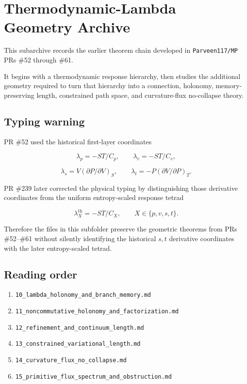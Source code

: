 \hypertarget{thermodynamic-lambda-geometry-archive}{%
\chapter{Thermodynamic-Lambda Geometry Archive}\label{thermodynamic-lambda-geometry-archive}}

This subarchive records the earlier theorem chain developed in \texttt{Parveen117/MP} PRs \#52 through \#61.

It begins with a thermodynamic response hierarchy, then studies the additional geometry required to turn that hierarchy into a connection, holonomy, memory-preserving length, constrained path space, and curvature-flux no-collapse theory.

\hypertarget{typing-warning}{%
\section{Typing warning}\label{typing-warning}}

PR \#52 used the historical first-layer coordinates

\[
\lambda_p=-ST/C_p,
\qquad
\lambda_v=-ST/C_v,
\]

\[
\lambda_s=V(\partial P/\partial V)_S,
\qquad
\lambda_t=-P(\partial V/\partial P)_T.
\]

PR \#239 later corrected the physical typing by distinguishing those derivative coordinates from the uniform entropy-scaled response tetrad

\[
\lambda_X^{\mathrm{th}}=-ST/C_X,
\qquad X\in\{p,v,s,t\}.
\]

Therefore the files in this subfolder preserve the geometric theorems from PRs \#52--\#61 without silently identifying the historical \(s,t\) derivative coordinates with the later entropy-scaled tetrad.

\hypertarget{reading-order}{%
\section{Reading order}\label{reading-order}}

\begin{enumerate}
\def\labelenumi{\arabic{enumi}.}
\tightlist
\item
  \texttt{10\_lambda\_holonomy\_and\_branch\_memory.md}
\item
  \texttt{11\_noncommutative\_holonomy\_and\_factorization.md}
\item
  \texttt{12\_refinement\_and\_continuum\_length.md}
\item
  \texttt{13\_constrained\_variational\_length.md}
\item
  \texttt{14\_curvature\_flux\_no\_collapse.md}
\item
  \texttt{15\_primitive\_flux\_spectrum\_and\_obstruction.md}
\end{enumerate}

